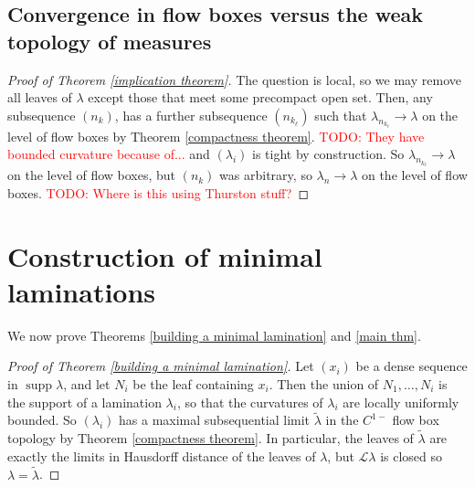 \documentclass[reqno,11pt]{amsart}
\DeclareMathOperator{\supp}{supp}
\newcommand{\Leaves}{\mathscr L}
\theoremstyle{definition}
\numberwithin{equation}{section}
\newcommand\todo[1]{\textcolor{red}{TODO: #1}}
\begin{document}
\subsection{Convergence in flow boxes versus the weak topology of measures}
\begin{proof}[Proof of Theorem \ref{implication theorem}]
The question is local, so we may remove all leaves of $\lambda$ except those that meet some precompact open set.
Then, any subsequence $(n_k)$, has a further subsequence $(n_{k_\ell})$ such that $\lambda_{n_{k_\ell}} \to \lambda$ on the level of flow boxes by Theorem \ref{compactness theorem}.
\todo{They have bounded curvature because of...} and $(\lambda_i)$ is tight by construction.
So $\lambda_{n_{k_\ell}} \to \lambda$ on the level of flow boxes, but $(n_k)$ was arbitrary, so $\lambda_n \to \lambda$ on the level of flow boxes. \todo{Where is this using Thurston stuff?}
\end{proof}


\section{Construction of minimal laminations}\label{construction}
We now prove Theorems \ref{building a minimal lamination} and \ref{main thm}.

\begin{proof}[Proof of Theorem \ref{building a minimal lamination}]
Let $(x_i)$ be a dense sequence in $\supp \lambda$, and let $N_i$ be the leaf containing $x_i$.
Then the union of $N_1, \dots, N_i$ is the support of a lamination $\lambda_i$, so that the curvatures of $\lambda_i$ are locally uniformly bounded.
So $(\lambda_i)$ has a maximal subsequential limit $\tilde \lambda$ in the $C^{1-}$ flow box topology by Theorem \ref{compactness theorem}.
In particular, the leaves of $\tilde \lambda$ are exactly the limits in Hausdorff distance of the leaves of $\lambda$, but $\Leaves \lambda$ is closed so $\lambda = \tilde \lambda$.
\end{proof}
\end{document}
